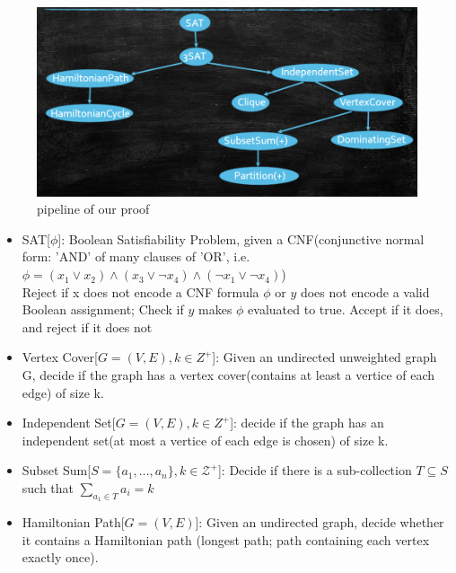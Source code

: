 \begin{figure}
    \centering
    \includegraphics[width=0.8\linewidth]{Notes/fig/pipeline_for_NP.png}
    \caption{pipeline of our proof}
    \label{fig:NP}
\end{figure}
\begin{itemize}
    \item SAT[$\phi$]:
    Boolean Satisfiability Problem, given a CNF(conjunctive normal form: 'AND' of many clauses of 'OR', i.e.$\phi=(x_1 \lor x_2) \land (x_3 \lor \neg x_4) \land (\neg x_1 \lor \neg x_4)$)\\
    Reject if x does not encode a CNF formula $\phi$ or $y$ does not encode a valid Boolean assignment; Check if $y$ makes $\phi$ evaluated to true. Accept if it does, and reject if it does not

    \item Vertex Cover[$G=(V,E), k \in Z^+$]: Given an undirected unweighted graph G, decide if the graph has a vertex cover(contains at least a vertice of each edge) of
    size k.
    \item Independent Set[$G=(V,E),k \in Z^+$]: decide if the graph has an independent set(at most a vertice of each edge is chosen) of size k.
    \item Subset Sum[$S=\{a_1,\ldots,a_n\},k \in \mathcal{Z}^+$]: Decide if there is a sub-collection $T \subseteq S$ such that $\sum_{a_1 \in T}a_i=k$
    \item Hamiltonian Path[$G=(V,E)$]: Given an undirected graph, decide whether it contains a Hamiltonian path (longest path; path containing each vertex exactly once).
\end{itemize}



